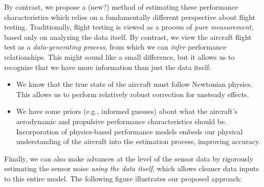 \documentclass[11pt]{article}
\providecommand{\tightlist}{%
      \setlength{\itemsep}{0pt}\setlength{\parskip}{0pt}}
\begin{document}
By contrast, we propose a (new?) method of estimating these performance
characteristics which relies on a fundamentally different perspective
about flight testing. Traditionally, flight testing is viewed as a
process of \emph{pure measurement}, based only on analyzing the data
itself. By contrast, we view the aircraft flight test as a
\emph{data-generating process}, from which we can \emph{infer}
performance relationships. This might sound like a small difference, but
it allows us to recognize that we have more information than just the
data itself:

\begin{itemize}
\tightlist
\item
  We know that the true state of the aircraft must follow Newtonian
  physics. This allows us to perform relatively robust correction for
  unsteady effects.
\item
  We have some priors (e.g., informed guesses) about what the aircraft's
  aerodynamic and propulsive performance characteristics should be.
  Incorporation of physics-based performance models embeds our physical
  understanding of the aircraft into the estimation process, improving
  accuracy.
\end{itemize}

Finally, we can also make advances at the level of the sensor data by
rigorously estimating the sensor noise \emph{using the data itself},
which allows cleaner data inputs to this entire model. The following
figure illustrates our proposed approach:
\end{document}

